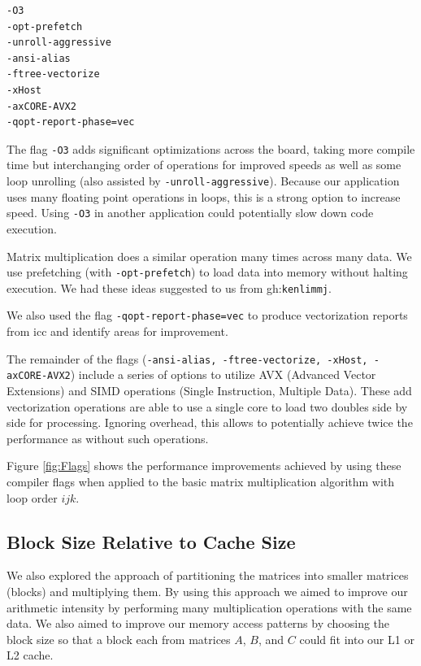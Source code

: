 \documentclass[12pt]{article}
\begin{document}
\begin{multicols}{3}
\begin{verbatim}
-O3 
-opt-prefetch 
-unroll-aggressive
-ansi-alias 
-ftree-vectorize 
-xHost 
-axCORE-AVX2 
-qopt-report-phase=vec
\end{verbatim}
\end{multicols}

The flag \texttt{-O3} adds significant optimizations across the board, taking more compile time but interchanging order of operations for improved speeds as well as some loop unrolling (also assisted by \texttt{-unroll-aggressive}).
Because our application uses many floating point operations in loops, this is a strong option to increase speed.
Using \texttt{-O3} in another application could potentially slow down code execution.

Matrix multiplication does a similar operation many times across many data. We use prefetching (with \texttt{-opt-prefetch}) to load data into memory without halting execution. We had these ideas suggested to us from gh:\texttt{kenlimmj}.

We also used the flag \texttt{-qopt-report-phase=vec} to produce vectorization reports from icc and identify areas for improvement.

The remainder of the flags (\texttt{-ansi-alias, -ftree-vectorize, -xHost,
-axCORE-AVX2}) include a series of options to utilize AVX (Advanced Vector Extensions) and SIMD operations (Single Instruction, Multiple Data).
These add vectorization operations are able to use a single core to load two doubles side by side for processing.
Ignoring overhead, this allows to potentially achieve twice the performance as without such operations. 

Figure \ref{fig:Flags} shows the performance improvements achieved by using these compiler flags when applied to the basic matrix multiplication algorithm with loop order $ijk$.

\subsection{Block Size Relative to Cache Size}

We also explored the approach of partitioning the matrices into smaller matrices (blocks) and multiplying them.
By using this approach we aimed to improve our arithmetic intensity by performing many multiplication operations with the same data.
We also aimed to improve our memory access patterns by choosing the block size so that a block each from matrices $A$, $B$, and $C$ could fit into our L1 or L2 cache.
\end{document}
